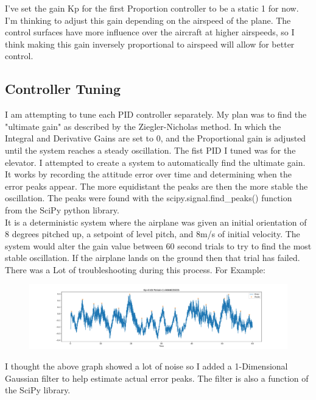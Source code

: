 \documentclass[11pt]{scrartcl} %
\begin{document}
I've set the gain Kp for the first Proportion controller to be a static 1 for now. I'm thinking to adjust this gain depending on the airspeed of the plane. The control surfaces have more influence over the aircraft at higher airspeeds, so I think making this gain inversely proportional to airspeed will allow for better control.

\subsection{Controller Tuning}

I am attempting to tune each PID controller separately. My plan was to find the "ultimate gain" as described by the Ziegler-Nicholas method. In which the Integral and Derivative Gains are set to 0, and the Proportional gain is adjusted until the system reaches a steady oscillation. The fist PID I tuned was for the elevator. I attempted to create a system to automatically find the ultimate gain. It works by recording the attitude error over time and determining when the error peaks appear. The more equidistant the peaks are then the more stable the oscillation. The peaks were found with the scipy.signal.find\_peaks() function from the SciPy python library. \\

It is a deterministic system where the airplane was given an initial orientation of 8 degrees pitched up, a setpoint of level pitch, and 8m/s of initial velocity. The system would alter the gain value between 60 second trials to try to find the most stable oscillation. If the airplane lands on the ground then that trial has failed. There was a Lot of troubleshooting during this process. For Example:

\begin{figure}[ht!] %
	\centering
	\includegraphics[trim={5cm 0 5cm 0},clip,width=\textwidth]{PIDnoise.pdf} 
\end{figure}

I thought the above graph showed a lot of noise so I added a 1-Dimensional Gaussian filter to help estimate actual error peaks. The filter is also a function of the SciPy library.
\end{document}
